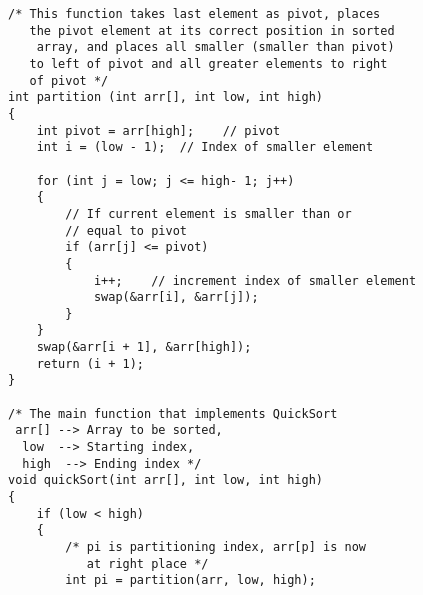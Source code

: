 \documentclass[11pt]{article}
\begin{document}
\begin{enumerate}
\begin{verbatim}
/* This function takes last element as pivot, places 
   the pivot element at its correct position in sorted 
    array, and places all smaller (smaller than pivot) 
   to left of pivot and all greater elements to right 
   of pivot */
int partition (int arr[], int low, int high) 
{ 
    int pivot = arr[high];    // pivot 
    int i = (low - 1);  // Index of smaller element 
  
    for (int j = low; j <= high- 1; j++) 
    { 
        // If current element is smaller than or 
        // equal to pivot 
        if (arr[j] <= pivot) 
        { 
            i++;    // increment index of smaller element 
            swap(&arr[i], &arr[j]); 
        } 
    } 
    swap(&arr[i + 1], &arr[high]); 
    return (i + 1); 
} 
  
/* The main function that implements QuickSort 
 arr[] --> Array to be sorted, 
  low  --> Starting index, 
  high  --> Ending index */
void quickSort(int arr[], int low, int high) 
{ 
    if (low < high) 
    { 
        /* pi is partitioning index, arr[p] is now 
           at right place */
        int pi = partition(arr, low, high); 
  

\end{verbatim}
\end{enumerate}
\end{document}
